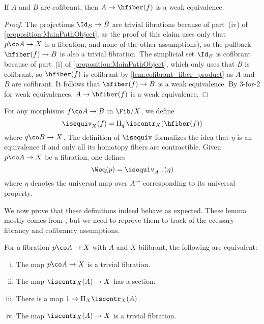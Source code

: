 \begin{lemma}
If $A$ and $B$ are cofibrant, then $A \rightarrow \hfiber(f)$ is a weak equivalence.
\end{lemma}

\begin{proof}
The projections $\Id_{B} \to B$ are trivial fibrations because of part~(iv) of \cref{proposition:MainPathObject}, as the proof of this claim uses  only that $p \co A \to X$ is a fibration, and none of the other assumptions), so the pullback $\hfiber(f) \rightarrow B$ is also a trivial fibration. The simplicial set $\Id_{B}$ is cofibrant because  of part~(i) of \cref{proposition:MainPathObject}, which only uses that $B$ is cofibrant, so $\hfiber(f)$ is cofibrant by \cref{lem:cofibrant_fiber_product} as $A$ and $B$ are cofibrant. It follows that $\hfiber(f) \rightarrow B$ is a weak equivalence. By 3-for-2 for weak equivalences, $A \rightarrow \hfiber(f)$ is a weak equivalence.
\end{proof}




For any morphisms $f \co A \to B$ in $\Fib/X$, we define
\[ 
\isequiv_X(f) = \Pi_{q}  \, \iscontr_X( \hfiber(f)) 
\]
where $q \co B \to X$. The definition of $\isequiv$ formalizes the idea that $\eta$ is an equivalence if and only all its homotopy fibers are contractible. Given $p \co A \to X$ be a fibration, one defines
\[ 
\Weq(p) = \isequiv_{A^{\to}}(\eta) 
\]
where $\eta$ denotes the universal map over $A^{\to}$ corresponding to its universal property. 

\medskip

We now prove  that these definitions indeed behave as expected. These lemma mostly comes from  \cite[Section 4]{shulman:reedy}, but we need to reprove them to track of the  ecessary fibrancy and cofibrancy assumptions.

\begin{lemma}\label{lem:IsContr1}For a fibration $p \co A \to X$ with $A$ and $X$ bifibrant, the following are equivalent:

\begin{enumerate}[(i)]
\item The map $p \co A \to X$ is a trivial fibration.
\item The map $\iscontr_X (A) \to X$ has a section.
\item There is a map $ 1 \rightarrow \Pi_X  \iscontr_X (A) $.
\item The map $\iscontr_X (A) \to X$ is a trivial fibration.
\end{enumerate}
\end{lemma}



